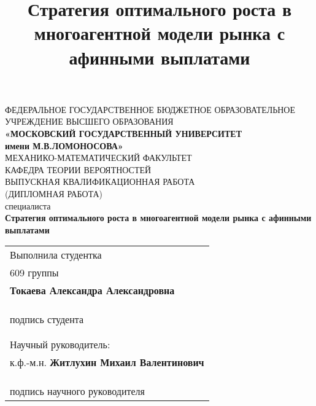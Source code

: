 \documentclass[a4paper,12pt,russian]{article} %
\title{Стратегия оптимального роста в многоагентной модели рынка с афинными выплатами}
\author{}
\date{}
\theoremstyle{definition}
\begin{document}
\begin{center}
    \footnotesize{ФЕДЕРАЛЬНОЕ ГОСУДАРСТВЕННОЕ БЮДЖЕТНОЕ ОБРАЗОВАТЕЛЬНОЕ}\\ 
    \footnotesize{УЧРЕЖДЕНИЕ ВЫСШЕГО ОБРАЗОВАНИЯ}\\
    \small{\textbf{«МОСКОВСКИЙ ГОСУДАРСТВЕННЫЙ УНИВЕРСИТЕТ}}\\
    \small{\textbf{имени М.В.ЛОМОНОСОВА»}}\\
    \hfill \break
    \normalsize{МЕХАНИКО-МАТЕМАТИЧЕСКИЙ ФАКУЛЬТЕТ}\\
     \hfill \break
    \normalsize{КАФЕДРА ТЕОРИИ ВЕРОЯТНОСТЕЙ}\\
    \hfill\break
    \hfill \break
    \hfill \break
    \large{ВЫПУСКНАЯ КВАЛИФИКАЦИОННАЯ РАБОТА}\\
    \large{(ДИПЛОМНАЯ РАБОТА)}\\
    \large{специалиста}\\
    \hfill \break
    \hfill \break
    \textbf{Стратегия оптимального роста в многоагентной модели рынка с афинными выплатами}\\
\end{center}
    \hfill \break
    \hfill \break
    
    \hfill
\begin{tabular}{@{}l@{}}
    Выполнила студентка\\
    609 группы \\
    \textbf{Токаева Александра Александровна} \\
    \hfill \\
    \hfill \\
    \underline{\hspace{3cm}} \\
    подпись студента \\
    
    \hfill \\
    \hfill \\
    
    Научный руководитель: \\
    к.ф.-м.н. \textbf{Житлухин Михаил Валентинович} \\
    \hfill \\
    \hfill \\
    \underline{\hspace{3cm}} \\
    подпись научного руководителя \\
\end{tabular}
    
    \hfill \break \\
    \hfill \\
    \hfill
    
\end{document}
